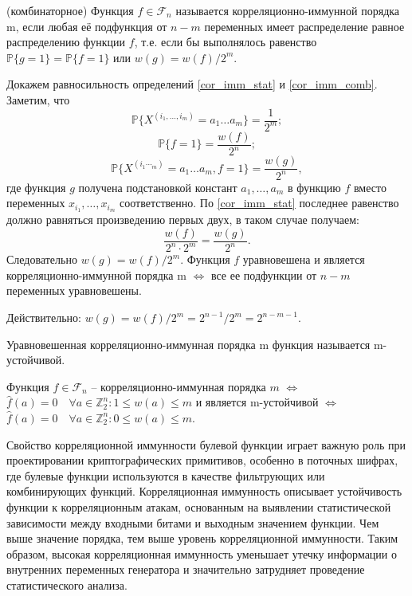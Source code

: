 \begin{definition}(комбинаторное)
    Функция $f \in \mathcal{F}_n$ называется корреляционно-иммунной порядка m, если любая её подфункция от $n - m$ переменных имеет распределение равное распределению функции $f$, т.е. если бы выполнялось равенство 
    $\mathbb{P}\{g = 1\} = \mathbb{P}\{f = 1\}$ или $w(g) = w(f)/2^m$.
    \label{cor_imm_comb}
\end{definition}
Докажем равносильность определений \eqref{cor_imm_stat} и \eqref{cor_imm_comb}. Заметим, что
\[
\mathbb{P}\{X^{(i_1,\dots,i_m)} = a_1 \dots a_m\} = \frac{1}{2^m};
\]
\[
    \mathbb{P}\{f = 1\} = \frac{w(f)}{2^n};
\]
\[
    \mathbb{P}\{X^{(i_1\dotsi_m)} = a_1 \dots a_m, f = 1\} = \frac{w(g)}{2^n},
\]
где функция $g$ получена подстановкой констант $a_1, \dots, a_m$ в функцию $f$ вместо переменных $x_{i_1}, \dots, x_{i_m}$ соответственно. По \eqref{cor_imm_stat} последнее равенство должно равняться произведению первых двух, в таком случае получаем:
\[
  \frac{w(f)}{2^n \cdot 2^m} = \frac{w(g)}{2^n}.
\]
Следовательно $w(g) = w(f)/2^m$.
Функция $f$ уравновешена и является корреляционно-иммунной порядка m $\Leftrightarrow$ все ее подфункции от $n-m$ переменных уравновешены.

Действительно: $w(g) = w(f)/2^m = 2^{n-1}/2^m = 2^{n-m-1}$.
\begin{definition}
    Уравновешенная корреляционно-иммунная порядка m функция называется m-устойчивой.
\end{definition}
\begin{theorem}
    Функция $f \in \mathcal{F}_n$ – корреляционно-иммунная порядка $m$ $\Leftrightarrow$ $\hat{f}(a) = 0 \quad \forall a \in \mathbb{Z}_2^n: 1 \leq w(a) \leq m$ и является m-устойчивой $\Leftrightarrow$ $\hat{f}(a) = 0 \quad \forall a \in \mathbb{Z}_2^n: 0 \leq w(a) \leq m$.
    \label{Критерий кор-иммун.}
\end{theorem}
Свойство корреляционной иммунности булевой функции играет важную роль при проектировании криптографических примитивов, особенно в поточных шифрах, где булевые функции используются в качестве фильтрующих или комбинирующих функций. Корреляционная иммунность описывает устойчивость функции к корреляционным атакам, основанным на выявлении статистической зависимости между входными битами и выходным значением функции. Чем выше значение порядка, тем выше уровень корреляционной иммунности. 
Таким образом, высокая корреляционная иммунность уменьшает утечку информации о внутренних переменных генератора и значительно затрудняет проведение статистического анализа.


